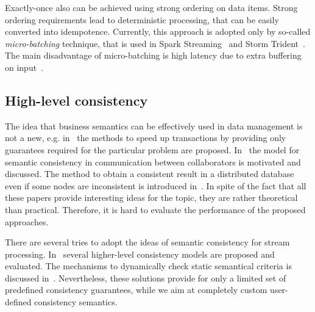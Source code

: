 Exactly-once also can be achieved using strong ordering on data items. Strong ordering requirements lead to deterministic processing, that can be easily converted into idempotence. Currently, this approach is adopted only by so-called {\em micro-batching} technique, that is used in Spark Streaming~\cite{Zaharia:2012:DSE:2342763.2342773} and Storm Trident~\cite{apache:storm:trident}. The main disadvantage of micro-batching is high latency due to extra buffering on input~\cite{S7530084}.

\subsection{High-level consistency}

The idea that business semantics can be effectively used in data management is not a new, e.g. in~\cite{Garcia-Molina:1983:USK:319983.319985} the methods to speed up transactions by providing only guarantees required for the particular problem are proposed. In~\cite{Guo:2010:CMS:1822018.1822052} the model for semantic consistency in communication between collaborators is motivated and discussed. The method to obtain a consistent result in a distributed database even if some nodes are inconsistent is introduced in~\cite{Rodriguez:2008:ITA:1463434.1463480}. In spite of the fact that all these papers provide interesting ideas for the topic, they are rather theoretical than practical. Therefore, it is hard to evaluate the performance of the proposed approaches.

There are several tries to adopt the ideas of semantic consistency for stream processing. In~\cite{Mihaila:2008:AIO:1458082.1458132} several higher-level consistency models are proposed and evaluated. The mechanisms to dynamically check static semantical criteria is discussed in~\cite{Fischer:2010:SSP:1739041.1739068}. Nevertheless, these solutions provide for only a limited set of predefined consistency guarantees, while we aim at completely custom user-defined consistency semantics.  
